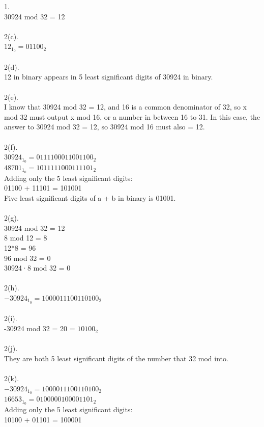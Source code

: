 \documentclass[a4paper, 20pt]{article}
\begin{document}
\begin{question}{1.}
\\ 30924 mod 32 = 12
\\
\\ 2(c).
\\ $12_1_0 = 01100_2$
\\
\\ 2(d).
\\ 12 in binary appears in 5 least significant digits of 30924 in binary.
\\
\\ 2(e).
\\ I know that 30924 mod 32 = 12, and 16 is a common denominator of 32, so x mod 32 must output x mod 16, or a number in between 16 to 31. In this case, the answer to 30924 mod 32 = 12, so 30924 mod 16 must also = 12.
\\
\\ 2(f).
\\ $30924_1_0 = 0111 1000 1100 1100_2$
\\ $48701_1_0 = 1011 1110 0011 1101_2$
\\ Adding only the 5 least significant digits:
\\ 01100 + 11101 = 101001
\\ Five least significant digits of a + b in binary is 01001.
\\
\\2(g).
\\ 30924 mod 32 = 12
\\ 8 mod 12 = 8
\\ 12*8 = 96
\\ 96 mod 32 = 0
\\ 30924·8 mod 32 = 0
\\
\\2(h).
\\ $-30924_1_0 = 1000 0111 0011 0100_2$
\\ 
\\ 2(i).
\\ -30924 mod 32 = 20 = $10100_2$
\\
\\ 2(j).
\\ They are both 5 least significant digits of the number that 32 mod into.
\\
\\ 2(k).
\\ $-30924_1_0 = 1000 0111 0011 0100_2$
\\ $16653_1_0 = 0100 0001 0000 1101_2$
\\ Adding only the 5 least significant digits:
\\ 10100 + 01101 = 100001

\end{question}
\end{document}
